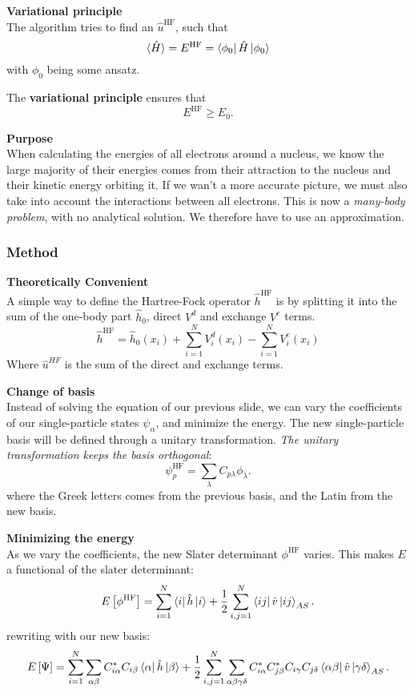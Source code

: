 \documentclass[UKenglish,aspectratio=169,12pt]{beamer}
\begin{document}
\begin{frame}
    \textbf{Variational principle}\\
    The algorithm tries to find an $\hat{u}^{\text{HF}}$, such that 
    \[
    \langle\hat{H}\rangle = E^{\text{HF}} = \bra{\phi_0}\hat{H}\ket{\phi_0}
    \]
    with $\phi_0$ being some ansatz. 

    The \textbf{variational principle} ensures that 
    \[
    E^{\text{HF}} \ge E_0.
    \]
\end{frame}

\begin{frame}
    \textbf{Purpose}\\
    When calculating the energies of all electrons around a nucleus, we know the large majority of their energies comes from their attraction to the nucleus and their kinetic energy orbiting it. If we wan't a more accurate picture, we must also take into account the interactions between all electrons. This is now a \textit{many-body problem}, with no analytical solution. We therefore have to use an approximation. 
\end{frame}

\begin{frame}
    \frametitle{Method}
    \textbf{Theoretically Convenient}\\
    A simple way to define the Hartree-Fock operator $\hat{h}^{\text{HF}}$ is by splitting it into the sum of the one-body part $\hat{h}_{0}$, direct $V^{d}$ and exchange $V^{e}$ terms. 
    \[
        \hat{h}^{\text{HF}} = \hat{h}_{0}(x_{i}) + \sum_{i=1}^{N} V_{i}^{d}(x_{i}) - \sum_{i=1}^{N} V_{i}^{e}(x_{i})
    \]
    Where $\hat{u}^{HF}$ is the sum of the direct and exchange terms.
\end{frame}

\begin{frame}
    \textbf{Change of basis}\\
    Instead of solving the equation of our previous slide, we can vary the coefficients of our single-particle states $\psi_{\alpha}$, and minimize the energy.  The new single-particle basis will be defined through a unitary transformation. \textit{The unitary transformation keeps the basis orthogonal}:
    \[
        \psi_{p}^{\text{HF}} = \sum_{\lambda} C_{p\lambda}\phi_{\lambda}.
    \]
  where the Greek letters comes from the previous basis, and the Latin from the new basis. 
\end{frame}

\begin{frame}
    \textbf{Minimizing the energy}\\
    As we vary the coefficients, the new Slater determinant $\phi^{\text{HF}}$ varies. This makes $E$ a functional of the slater determinant:
    \[
        E\left[\phi^{\text{HF}}\right] = \sum_{i=1}^{N} \bra{i}\hat{h}\ket{i} + \frac{1}{2} \sum_{i,j = 1}^{N} \bra{ij}\hat{v}\ket{ij}_{AS}. 
    \]
    rewriting with our new basis:
    \[
        E\left[\Psi\right] = \sum_{i=1}^{N}\sum_{\alpha\beta} C^{*}_{i\alpha}C_{i\beta} \bra{\alpha}\hat{h}\ket{\beta} + \frac{1}{2} \sum_{i,j = 1}^{N}\sum_{\alpha\beta\gamma\delta} C^{*}_{i\alpha}C^{*}_{j\beta}C_{i\gamma}C_{j\delta} \bra{\alpha\beta}\hat{v}\ket{\gamma\delta}_{AS}.
    \]
\end{frame}
\end{document}
